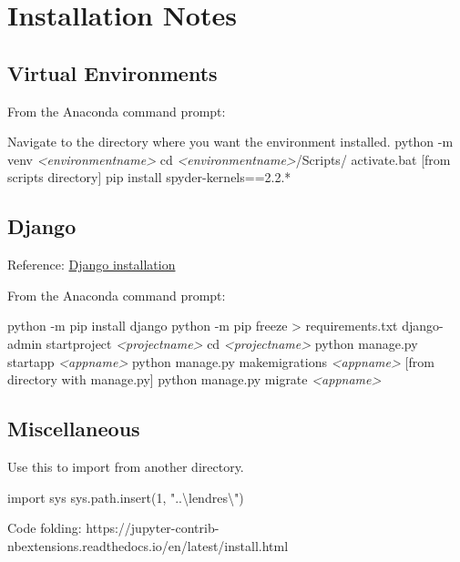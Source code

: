 	\chapter{Installation Notes}

	\section{Virtual Environments}
From the Anaconda command prompt:
	\begin{code}[\codenumbering]{}
		\codeitemnonumber Navigate to the directory where you want the environment installed.
		\codeitemnonumber python -m venv \textit{<environmentname>}
		\codeitemnonumber cd \textit{<environmentname>}/Scripts/
		\codeitemnonumber activate.bat [from scripts directory]
		\codeitemnonumber pip install spyder-kernels==2.2.*
	\end{code}

	\section{Django}
Reference: \href{https://realpython.com/django-setup/#mysql}{Django installation}

\noindent From the Anaconda command prompt:
	\begin{code}[\codenumbering]{}
		\codeitemnonumber python -m pip install django
		\codeitemnonumber python -m pip freeze > requirements.txt
		\codeitemnonumber django-admin startproject \textit{<projectname>}
		\codeitemnonumber cd \textit{<projectname>}
		\codeitemnonumber python manage.py startapp \textit{<appname>}
		\codeitemnonumber python manage.py makemigrations \textit{<appname>} [from directory with manage.py]
		\codeitemnonumber python manage.py migrate \textit{<appname>}
	\end{code}


	\section{Miscellaneous}

Use this to import from another directory.
	\begin{code}[\codenumbering]{}
		\codeitemnonumber import sys
		\codeitemnonumber sys.path.insert(1, "..\textbackslash{}lendres\textbackslash{}")
	\end{code}


Code folding:
https://jupyter-contrib-nbextensions.readthedocs.io/en/latest/install.html

